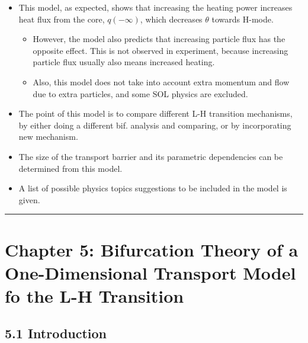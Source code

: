 \documentclass[a4paper]{article}
\begin{document}
\begin{itemize}
\item
  This model, as expected, shows that increasing the heating power
  increases heat flux from the core, $q(-\infty)$, which decreases
  $\theta$ towards H-mode.

  \begin{itemize}
  \item
    However, the model also predicts that increasing particle flux has
    the opposite effect. This is not observed in experiment, because
    increasing particle flux usually also means increased heating.
  \item
    Also, this model does not take into account extra momentum and flow
    due to extra particles, and some SOL physics are excluded.
  \end{itemize}
\item
  The point of this model is to compare different L-H transition
  mechanisms, by either doing a different bif. analysis and comparing,
  or by incorporating new mechanism.
\item
  The size of the transport barrier and its parametric dependencies can
  be determined from this model.
\item
  A list of possible physics topics suggestions to be included in the
  model is given.
\end{itemize}

\begin{center}\rule{3in}{0.4pt}\end{center}

\section{Chapter 5: Bifurcation Theory of a One-Dimensional Transport
Model fo the L-H
Transition}\label{chapter-5-bifurcation-theory-of-a-one-dimensional-transport-model-fo-the-l-h-transition}

\subsection{5.1 Introduction}\label{introduction-2}
\end{document}
